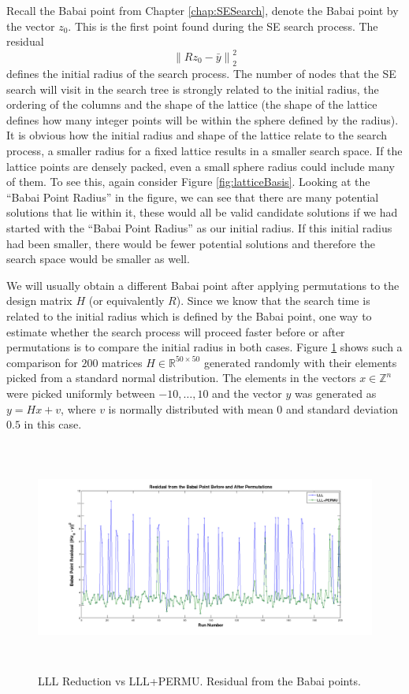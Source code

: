 \documentclass[12pt,Bold,letterpaper]{mcgilletdclass}
\begin{document}
Recall the Babai point from Chapter \ref{chap:SESearch}, denote the Babai point by the vector $z_0$. This is the first point found during the SE search process. The residual $$\left \| Rz_0 - \bar{y} \right \|^2_2$$ defines the initial radius of the search process. The number of nodes that the SE search will visit in the search tree is strongly related to the initial radius, the ordering of the columns and the shape of the lattice (the shape of the lattice defines how many integer points will be within the sphere defined by the radius). It is obvious how the initial radius and shape of the lattice relate to the search process, a smaller radius for a fixed lattice results in a smaller search space. If the lattice points are densely packed, even a small sphere radius could include many of them. To see this, again consider Figure \ref{fig:latticeBasis}. Looking at the ``Babai Point Radius'' in the figure, we can see that there are many potential solutions that lie within it, these would all be valid candidate solutions if we had started with the ``Babai Point Radius'' as our initial radius. If this initial radius had been smaller, there would be fewer potential solutions and therefore the search space would be smaller as well.

We will usually obtain a different Babai point after applying permutations to the design matrix $H$ (or equivalently $R$). Since we know that the search time is related to the initial radius which is defined by the Babai point, one way to estimate whether the search process will proceed faster before or after permutations is to compare the initial radius in both cases. Figure \ref{fig:LLLvsPermuBabai} shows such a comparison for $200$ matrices $H \in \mathbb{R}^{50 \times 50}$ generated randomly with their elements picked from a standard normal distribution. The elements in the vectors $x \in \mathbb{Z}^n$ were picked uniformly between $-10 , \dots, 10$ and the vector $y$ was generated as $y = Hx + v$, where $v$ is normally distributed with mean $0$ and standard deviation $0.5$ in this case.

\begin{figure}
\centering
\includegraphics[width=6in,height=3in]{lllvslllpermubabai.png}
\caption{LLL Reduction vs LLL+PERMU. Residual from the Babai points.}
\label{fig:LLLvsPermuBabai}
\end{figure}
\end{document}
